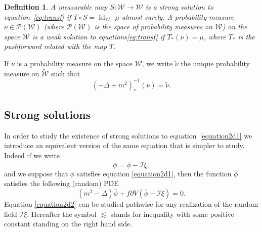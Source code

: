 \documentclass[a4paper,10pt]{article}
\newcommand{\asterisk}{\mathord{*}}
\newcommand{\tmem}[1]{{\em #1\/}}
\newcommand{\tmop}[1]{\ensuremath{\operatorname{#1}}}
\newtheorem{definition}[theorem]{Definition}
\begin{document}
\begin{definition}
  \label{definition_solution}A measurable map $S : \mathcal{W} \rightarrow
  \mathcal{W}$ is a {\tmem{strong solution}} to equation~{\eqref{eq:transf}}
  if $T \circ S = \tmop{Id}_{\mathcal{W}}$ $\mu$-almost surely. A probability
  measure $\nu \in \mathcal{P} (\mathcal{W})$ (where $\mathcal{P}
  (\mathcal{W})$ is the space of probability measures on $\mathcal{W}$) on the
  space $\mathcal{W}$ is a {\tmem{weak solution}} to
  equations{\eqref{eq:transf}} if $T_{\asterisk} (\nu) = \mu$, where
  $T_{\ast}$ is the pushforward related with the map $T$.
\end{definition}

If $\nu$ is a probability measure on the space $\mathcal{W}$, we write
$\tilde{\nu}$ the unique probability measure on $\widetilde{\mathcal{W}}$ such
that
\begin{equation}
  (- \Delta + m^2)^{- 1}_{\asterisk} (\nu) = \tilde{\nu} . \label{eq:tildenu}
\end{equation}

\subsection{Strong solutions}

In order to study the existence of strong solutions to
equation~{\eqref{equation2d1}} we introduce an equivalent version of the same
equation that is simpler to study. Indeed if we write
\[ \bar{\phi} = \phi -\mathcal{I} \xi, \]
and we suppose that $\phi$ satisfies equation {\eqref{equation2d1}}, then the
function $\bar{\phi}$ satisfies the following (random) PDE
\begin{equation}
  (m^2 - \Delta) \bar{\phi} + f \partial V (\bar{\phi} -\mathcal{I} \xi) = 0.
  \label{equation2d2}
\end{equation}
Equation {\eqref{equation2d2}} can be studied pathwise for any realization of
the random field $\mathcal{I} \xi$. Hereafter the symbol $\lesssim$ stands for
inequality with some positive constant standing on the right hand side.
\end{document}
